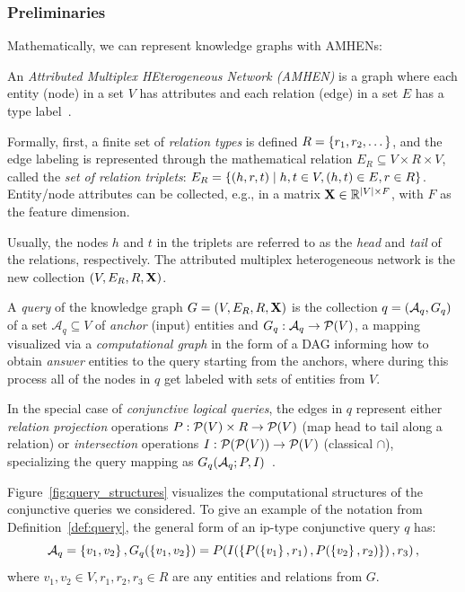 \subsubsection{Preliminaries}

Mathematically, we can represent knowledge graphs with AMHENs:
\begin{definition}
An \emph{Attributed Multiplex HEterogeneous Network (AMHEN)} is a graph where each entity (node) in a set $V$ has attributes and each relation (edge) in a set $E$ has a type label~\cite{liu_ahng_2019,cen_representation_2019}. 

Formally, first, a finite set of \emph{relation types} is defined $R = \mathopen{}\left\{r_1,r_2,\dots\right\}$, and the edge labeling is represented through the mathematical relation $E_R \subseteq V \times R \times V$, called the \emph{set of relation triplets}:  $E_R = \mathopen{}\left\{\mathopen{}\left(h,r,t\right) \mid h,t \in V, \mathopen{}\left(h,t\right) \in E, r \in R\right\}$. Entity/node attributes can be collected, e.g., in a matrix $\mathbf{X} \in \mathbb{R}^{\mathopen{}\left|V\right| \times F}$, with $F$ as the feature dimension. 

Usually, the nodes $h$ and $t$ in the triplets are referred to as the \emph{head} and \emph{tail} of the relations, respectively. The attributed multiplex heterogeneous network is the new collection $\mathopen{}\left(V, E_R, R, \mathbf{X}\right)$.
\end{definition}

\begin{definition}
    A \emph{query} of the knowledge graph $G=\mathopen{}\left(V, E_R, R, \mathbf{X}\right)$ is the collection $q=\mathopen{}\left(\mathcal{A}_q, G_q\right)$ of a set $\mathcal{A}_q \subseteq V$ of \emph{anchor} (input) entities and $G_q: \mathcal{A}_q \to \mathcal{P}\mathopen{}\left(V\right)$, a mapping visualized via a \emph{computational graph} in the form of a DAG informing how to obtain \emph{answer} entities to the query starting from the anchors, where during this process all of the nodes in $q$ get labeled with sets of entities from $V$. 
    
    In the special case of \emph{conjunctive logical queries}, the edges in $q$ represent either \emph{relation projection} operations $P: \mathcal{P}\mathopen{}\left(V\right) \times R \to \mathcal{P}\mathopen{}\left(V\right)$ (map head to tail along a relation) or \emph{intersection} operations $I: \mathcal{P}\mathopen{}\left(\mathcal{P}\mathopen{}\left(V\right)\right) \to \mathcal{P}\mathopen{}\left(V\right)$ (classical $\cap$), specializing the query mapping as $G_q\mathopen{}\left(\mathcal{A}_q;P,I\right)$~\cite{ren_query2box_2020}.
    \label{def:query}
\end{definition}
Figure~\ref{fig:query_structures} visualizes the computational structures of the conjunctive queries we considered. To give an example of the notation from Definition~\ref{def:query}, the general form of an ip-type conjunctive query $q$ has: 
\begin{equation}
    \mathcal{A}_q=\mathopen{}\left\{v_1,v_2\right\}, G_q\mathopen{}\left(\mathopen{}\left\{v_1,v_2\right\}\right)=P\mathopen{}\left(I\mathopen{}\left(\mathopen{}\left\{P\mathopen{}\left(\mathopen{}\left\{v_1\right\},r_1\right),P\mathopen{}\left(\mathopen{}\left\{v_2\right\},r_2\right)\right\}\right),r_3\right),
\end{equation}
where $v_1,v_2 \in V, r_1,r_2,r_3 \in R$ are any entities and relations from $G$.

